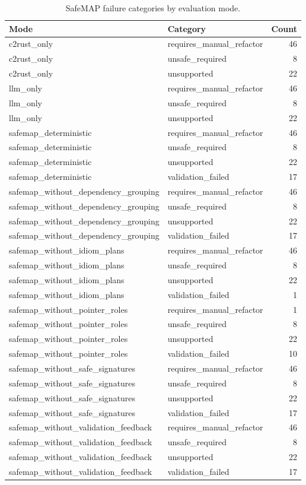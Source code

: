 \begin{table}[t]
\centering
\caption{SafeMAP failure categories by evaluation mode.}
\label{tab:safemap-failure-summary}
\begin{tabular}{llr}
\hline
Mode & Category & Count \\
\hline
c2rust\_only & requires\_manual\_refactor & 46 \\
c2rust\_only & unsafe\_required & 8 \\
c2rust\_only & unsupported & 22 \\
llm\_only & requires\_manual\_refactor & 46 \\
llm\_only & unsafe\_required & 8 \\
llm\_only & unsupported & 22 \\
safemap\_deterministic & requires\_manual\_refactor & 46 \\
safemap\_deterministic & unsafe\_required & 8 \\
safemap\_deterministic & unsupported & 22 \\
safemap\_deterministic & validation\_failed & 17 \\
safemap\_without\_dependency\_grouping & requires\_manual\_refactor & 46 \\
safemap\_without\_dependency\_grouping & unsafe\_required & 8 \\
safemap\_without\_dependency\_grouping & unsupported & 22 \\
safemap\_without\_dependency\_grouping & validation\_failed & 17 \\
safemap\_without\_idiom\_plans & requires\_manual\_refactor & 46 \\
safemap\_without\_idiom\_plans & unsafe\_required & 8 \\
safemap\_without\_idiom\_plans & unsupported & 22 \\
safemap\_without\_idiom\_plans & validation\_failed & 1 \\
safemap\_without\_pointer\_roles & requires\_manual\_refactor & 1 \\
safemap\_without\_pointer\_roles & unsafe\_required & 8 \\
safemap\_without\_pointer\_roles & unsupported & 22 \\
safemap\_without\_pointer\_roles & validation\_failed & 10 \\
safemap\_without\_safe\_signatures & requires\_manual\_refactor & 46 \\
safemap\_without\_safe\_signatures & unsafe\_required & 8 \\
safemap\_without\_safe\_signatures & unsupported & 22 \\
safemap\_without\_safe\_signatures & validation\_failed & 17 \\
safemap\_without\_validation\_feedback & requires\_manual\_refactor & 46 \\
safemap\_without\_validation\_feedback & unsafe\_required & 8 \\
safemap\_without\_validation\_feedback & unsupported & 22 \\
safemap\_without\_validation\_feedback & validation\_failed & 17 \\
\hline
\end{tabular}
\end{table}

